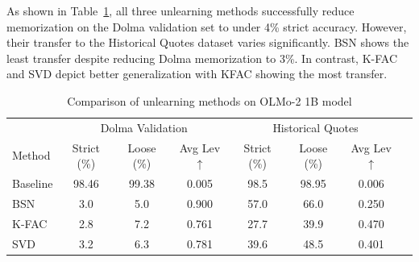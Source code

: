 \documentclass{article} %
\begin{document}
As shown in Table~\ref{tab:results_1b}, all three unlearning methods successfully reduce memorization on the Dolma validation set to under 4\% strict accuracy. However, their transfer to the Historical Quotes dataset varies significantly. BSN shows the least transfer despite reducing Dolma memorization to 3\%. In contrast, K-FAC and SVD depict better generalization with KFAC showing the most transfer.


\begin{table}[t]
\centering
\small
\begin{tabular}{lccccccl}
\hline
         & \multicolumn{3}{c}{Dolma Validation}          & \multicolumn{3}{c}{Historical Quotes}         \\
Method   & Strict (\%) & Loose (\%) & Avg Lev $\uparrow$ & Strict (\%) & Loose (\%) & Avg Lev $\uparrow$ \\ \hline
Baseline & 98.46        & 99.38       & 0.005              & 98.5        & 98.95       & 0.006              \\
BSN      & 3.0         & 5.0        & 0.900              & 57.0         & 66.0       & 0.250              \\
K-FAC    & 2.8         & 7.2        & 0.761              & 27.7        & 39.9       & 0.470              \\
SVD      & 3.2         & 6.3        & 0.781              & 39.6        & 48.5       & 0.401              \\ \hline
\end{tabular}
\caption{Comparison of unlearning methods on OLMo-2 1B model}
\label{tab:results_1b}
\vspace{-0.5em}
\end{table}
\end{document}
